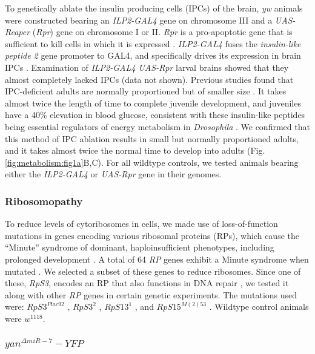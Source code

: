 To genetically ablate the insulin producing cells (IPCs) of the brain, \textit{yw} animals were constructed bearing an \textit{ILP2-GAL4} gene on chromosome III and a \textit{UAS-Reaper} (\textit{Rpr}) gene on chromosome I or II. \textit{Rpr} is a pro-apoptotic gene that is sufficient to kill cells in which it is expressed \cite{Lohmann2002}. \textit{ILP2-GAL4} fuses the \textit{insulin-like peptide 2} gene promoter to GAL4, and specifically drives its expression in brain IPCs \cite{Rulifson2002}. Examination of \textit{ILP2-GAL4 UAS-Rpr} larval brains showed that they almost completely lacked IPCs (data not shown). Previous studies found that IPC-deficient adults are normally proportioned but of smaller size \cite{Rulifson2002}. It takes almost twice the length of time to complete juvenile development, and juveniles have a 40\% elevation in blood glucose, consistent with these insulin-like peptides being essential regulators of energy metabolism in \textit{Drosophila} \cite{Rulifson2002}. We confirmed that this method of IPC ablation results in small but normally proportioned adults, and it takes almost twice the normal time to develop into adults (Fig. \ref{fig:metabolism:fig1a}B,C). For all wildtype controls, we tested animals bearing either the \textit{ILP2-GAL4} or \textit{UAS-Rpr} gene in their genomes.

\subsubsection{Ribosomopathy}
\label{appendix:supp:metabolism:exp:ribosomopathy}

To reduce levels of cytoribosomes in cells, we made use of loss-of-function mutations in genes encoding various ribosomal proteins (RPs), which cause the ``Minute'' syndrome of dominant, haploinsufficient phenotypes, including prolonged development \cite{SaboeLarssen1998}. A total of 64 \textit{RP} genes exhibit a Minute syndrome when mutated \cite{Marygold2007}. We selected a subset of these genes to reduce ribosomes. Since one of these, \textit{RpS3}, encodes an RP that also functions in DNA repair \cite{Graifer2014}, we tested it along with other \textit{RP} genes in certain genetic experiments. The mutations used were: $RpS3^{Plac92}$ \cite{SaboeLarssen1998}, $RpS3^{2}$ \cite{Ferrus1975}, $RpS13^{1}$ \cite{SaboeLarssen1998}, and $RpS15^{M(2)53}$ \cite{Golic1996}. Wildtype control animals were $w^{1118}$.

\subsubsection{$yan^{\Delta miR-7}-YFP$}
\label{appendix:supp:metabolism:exp:yan_delta}

